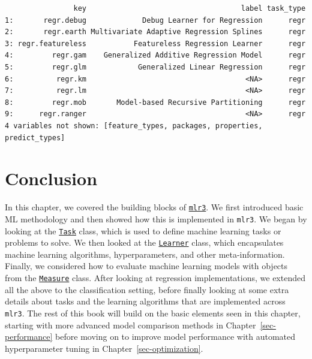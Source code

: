 \begin{Shaded}
\begin{Highlighting}[]
\NormalTok{learners\_dt[task\_type }\SpecialCharTok{==}  \SpecialCharTok{\&}
   \NormalTok{ x)]}
\end{Highlighting}
\end{Shaded}

\begin{verbatim}
                key                                    label task_type
1:       regr.debug             Debug Learner for Regression      regr
2:       regr.earth Multivariate Adaptive Regression Splines      regr
3: regr.featureless           Featureless Regression Learner      regr
4:         regr.gam    Generalized Additive Regression Model      regr
5:         regr.glm            Generalized Linear Regression      regr
6:          regr.km                                     <NA>      regr
7:          regr.lm                                     <NA>      regr
8:         regr.mob       Model-based Recursive Partitioning      regr
9:      regr.ranger                                     <NA>      regr
4 variables not shown: [feature_types, packages, properties, predict_types]
\end{verbatim}

\hypertarget{conclusion}{%
\section{Conclusion}\label{conclusion}}

In this chapter, we covered the building blocks of
\href{https://mlr3.mlr-org.com}{\texttt{mlr3}}. We
first introduced basic ML methodology and then showed how this is
implemented in \texttt{mlr3}. We began by looking at the
\href{https://mlr3.mlr-org.com/reference/Task.html}{\texttt{Task}}
class, which is used to define machine learning tasks or problems to
solve. We then looked at the
\href{https://mlr3.mlr-org.com/reference/Learner.html}{\texttt{Learner}}
class, which encapsulates machine learning algorithms, hyperparameters,
and other meta-information. Finally, we considered how to evaluate
machine learning models with objects from the
\href{https://mlr3.mlr-org.com/reference/Measure.html}{\texttt{Measure}}
class. After looking at regression implementations, we extended all the
above to the classification setting, before finally looking at some
extra details about tasks and the learning algorithms that are
implemented across \texttt{mlr3}. The rest of this book will build on
the basic elements seen in this chapter, starting with more advanced
model comparison methods in Chapter~\ref{sec-performance} before moving
on to improve model performance with automated hyperparameter tuning in
Chapter~\ref{sec-optimization}.

